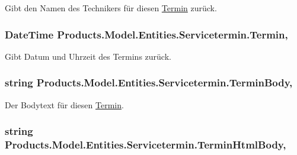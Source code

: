 Gibt den Namen des Technikers für diesen \hyperlink{class_products_1_1_model_1_1_entities_1_1_termin}{Termin} zurück. 

\subsubsection[{\texorpdfstring{Termin}{Termin}}]{\setlength{\rightskip}{0pt plus 5cm}Date\+Time Products.\+Model.\+Entities.\+Servicetermin.\+Termin\hspace{0.3cm}{\ttfamily [get]}, {\ttfamily [set]}}\hypertarget{class_products_1_1_model_1_1_entities_1_1_servicetermin_ad18665f5f87fdac83568d8ca706eee42}{}\label{class_products_1_1_model_1_1_entities_1_1_servicetermin_ad18665f5f87fdac83568d8ca706eee42}


Gibt Datum und Uhrzeit des Termins zurück. 

\subsubsection[{\texorpdfstring{Termin\+Body}{TerminBody}}]{\setlength{\rightskip}{0pt plus 5cm}string Products.\+Model.\+Entities.\+Servicetermin.\+Termin\+Body\hspace{0.3cm}{\ttfamily [get]}, {\ttfamily [set]}}\hypertarget{class_products_1_1_model_1_1_entities_1_1_servicetermin_ab98abfbe8efceb4ef50973768796aab8}{}\label{class_products_1_1_model_1_1_entities_1_1_servicetermin_ab98abfbe8efceb4ef50973768796aab8}


Der Bodytext für diesen \hyperlink{class_products_1_1_model_1_1_entities_1_1_termin}{Termin}. 

\subsubsection[{\texorpdfstring{Termin\+Html\+Body}{TerminHtmlBody}}]{\setlength{\rightskip}{0pt plus 5cm}string Products.\+Model.\+Entities.\+Servicetermin.\+Termin\+Html\+Body\hspace{0.3cm}{\ttfamily [get]}, {\ttfamily [set]}}\hypertarget{class_products_1_1_model_1_1_entities_1_1_servicetermin_a4a7dca909a09e0996d693db9cd11aade}{}\label{class_products_1_1_model_1_1_entities_1_1_servicetermin_a4a7dca909a09e0996d693db9cd11aade}


